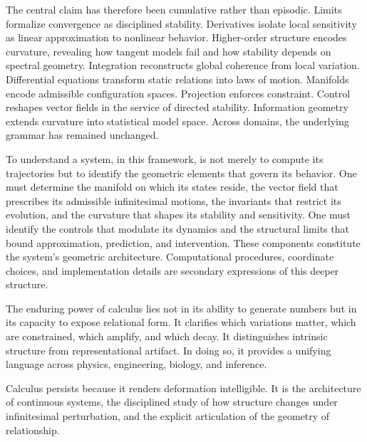\documentclass[12pt]{book}
\begin{document}
The central claim has therefore been cumulative rather than episodic.
Limits formalize convergence as disciplined stability. Derivatives
isolate local sensitivity as linear approximation to nonlinear
behavior. Higher-order structure encodes curvature, revealing how
tangent models fail and how stability depends on spectral geometry.
Integration reconstructs global coherence from local variation.
Differential equations transform static relations into laws of motion.
Manifolds encode admissible configuration spaces. Projection enforces
constraint. Control reshapes vector fields in the service of directed
stability. Information geometry extends curvature into statistical
model space. Across domains, the underlying grammar has remained
unchanged.

To understand a system, in this framework, is not merely to compute
its trajectories but to identify the geometric elements that govern
its behavior. One must determine the manifold on which its states
reside, the vector field that prescribes its admissible infinitesimal
motions, the invariants that restrict its evolution, and the curvature
that shapes its stability and sensitivity. One must identify the
controls that modulate its dynamics and the structural limits that
bound approximation, prediction, and intervention. These components
constitute the system’s geometric architecture. Computational
procedures, coordinate choices, and implementation details are
secondary expressions of this deeper structure.

The enduring power of calculus lies not in its ability to generate
numbers but in its capacity to expose relational form. It clarifies
which variations matter, which are constrained, which amplify, and
which decay. It distinguishes intrinsic structure from representational
artifact. In doing so, it provides a unifying language across physics,
engineering, biology, and inference.

Calculus persists because it renders deformation intelligible.
It is the architecture of continuous systems, the disciplined study of
how structure changes under infinitesimal perturbation, and the
explicit articulation of the geometry of relationship.
\end{document}
